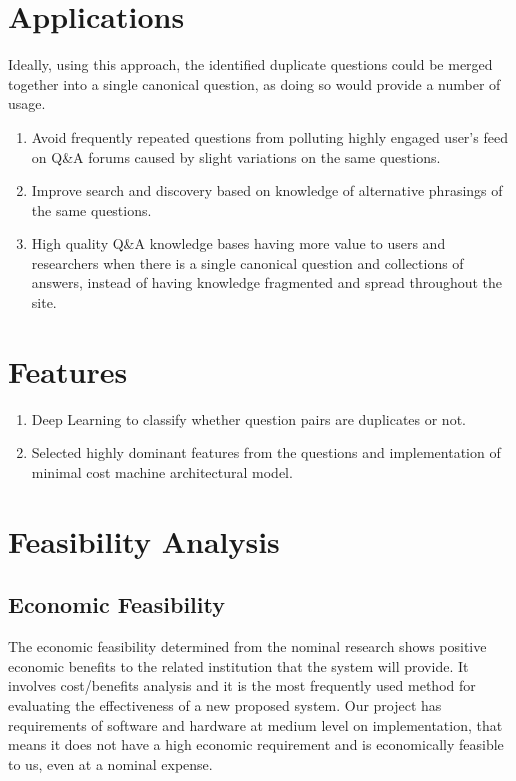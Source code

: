 \section{Applications}
Ideally, using this approach, the identified duplicate questions could be merged together into a single canonical question, as doing so would provide a number of usage.  
\begin{enumerate}
	\item Avoid frequently repeated questions from polluting highly engaged user's feed on Q\&A forums caused by slight variations on the same questions.
	\item Improve search and discovery based on knowledge of alternative phrasings of the same questions.
	\item High quality Q\&A knowledge bases having more value to users and researchers when there is a single canonical question and collections of answers, instead of having knowledge fragmented and spread throughout the site.
\end{enumerate}


\section{Features}
\begin{enumerate}
\item Deep Learning to classify whether question pairs are duplicates or not.
\item Selected highly dominant features from the questions and implementation of minimal cost machine architectural model.
\end{enumerate}


\section{Feasibility Analysis}
\subsection{Economic Feasibility}
The economic feasibility determined from the nominal research shows positive economic benefits to the related institution that the system will provide. It involves cost/benefits analysis and it is the most frequently used method for evaluating the effectiveness of a new proposed system. Our project has requirements of software and hardware at medium level on implementation, that means it does not have a high economic requirement and is economically feasible to us, even at a nominal expense.
\par

